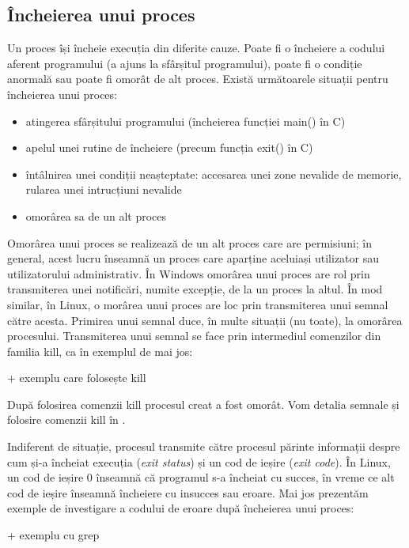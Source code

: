 \subsection{Încheierea unui proces}
\label{sec:procese-operatii-incheiere}

Un proces își încheie execuția din diferite cauze. Poate fi o încheiere a
codului aferent programului (a ajuns la sfârșitul programului), poate fi o
condiție anormală sau poate fi omorât de alt proces. Există următoarele situații
pentru încheierea unui proces:

\begin{itemize}
	\item atingerea sfârșitului programului (încheierea funcției main() în C)
	\item apelul unei rutine de încheiere (precum funcția exit() în C)
	\item întâlnirea unei condiții neașteptate: accesarea unei zone nevalide
		de memorie, rularea unei intrucțiuni nevalide
	\item omorârea sa de un alt proces
\end{itemize}

Omorârea unui proces se realizează de un alt proces care are permisiuni; în
general, acest lucru înseamnă un proces care aparține aceluiași utilizator sau
utilizatorului administrativ. În Windows omorârea unui proces are rol prin
transmiterea unei notificări, numite excepție, de la un proces la altul. În mod
similar, în Linux, o morârea unui proces are loc prin transmiterea unui semnal
către acesta. Primirea unui semnal duce, în multe situații (nu toate), la
omorârea procesului. Transmiterea unui semnal se face prin intermediul
comenzilor din familia kill, ca în exemplul de mai jos:

+ exemplu care folosește kill

După folosirea comenzii kill procesul creat a fost omorât. Vom detalia semnale
și folosire comenzii kill în
.

Indiferent de situație, procesul transmite către procesul părinte informații
despre cum și-a încheiat execuția (\textit{exit status}) și un cod de ieșire
(\textit{exit code}). În Linux, un cod de ieșire 0 înseamnă că programul s-a
încheiat cu succes, în vreme ce alt cod de ieșire înseamnă încheiere cu insucces
sau eroare. Mai jos prezentăm exemple de investigare a codului de eroare după
încheierea unui proces:

+  exemplu cu grep

